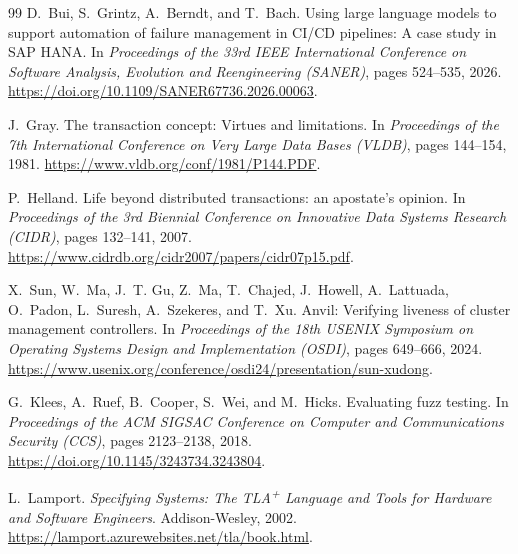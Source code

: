 \begin{thebibliography}{99}
D.~Bui, S.~Grintz, A.~Berndt, and T.~Bach.
Using large language models to support automation of failure management in
CI/CD pipelines: A case study in SAP HANA.
In \emph{Proceedings of the 33rd IEEE International Conference on Software
Analysis, Evolution and Reengineering (SANER)}, pages 524--535, 2026.
\url{https://doi.org/10.1109/SANER67736.2026.00063}.

J.~Gray.
The transaction concept: Virtues and limitations.
In \emph{Proceedings of the 7th International Conference on Very Large
Data Bases (VLDB)}, pages 144--154, 1981.
\url{https://www.vldb.org/conf/1981/P144.PDF}.

P.~Helland.
Life beyond distributed transactions: an apostate's opinion.
In \emph{Proceedings of the 3rd Biennial Conference on Innovative Data
Systems Research (CIDR)}, pages 132--141, 2007.
\url{https://www.cidrdb.org/cidr2007/papers/cidr07p15.pdf}.

X.~Sun, W.~Ma, J.~T. Gu, Z.~Ma, T.~Chajed, J.~Howell, A.~Lattuada,
O.~Padon, L.~Suresh, A.~Szekeres, and T.~Xu.
Anvil: Verifying liveness of cluster management controllers.
In \emph{Proceedings of the 18th USENIX Symposium on Operating Systems
Design and Implementation (OSDI)}, pages 649--666, 2024.
\url{https://www.usenix.org/conference/osdi24/presentation/sun-xudong}.

G.~Klees, A.~Ruef, B.~Cooper, S.~Wei, and M.~Hicks.
Evaluating fuzz testing.
In \emph{Proceedings of the ACM SIGSAC Conference on Computer and
Communications Security (CCS)}, pages 2123--2138, 2018.
\url{https://doi.org/10.1145/3243734.3243804}.

L.~Lamport.
\emph{Specifying Systems: The TLA\textsuperscript{+} Language and
Tools for Hardware and Software Engineers}.
Addison-Wesley, 2002.
\url{https://lamport.azurewebsites.net/tla/book.html}.

\end{thebibliography}
